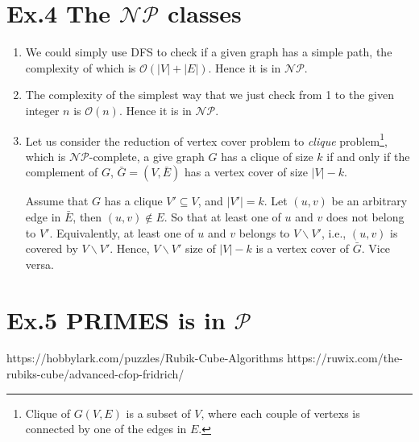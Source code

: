 \documentclass[a4paper]{article}
\begin{document}
\section*{Ex.4 The $\mathcal{NP}$ classes}
\begin{enumerate}
	\item We could simply use DFS to check if a given graph has a simple path, the complexity of which is $\mathcal{O}(|V|+|E|)$. Hence it is in $\mathcal{NP}$.
	\item The complexity of the simplest way that we just check from 1 to the given integer $n$ is $\mathcal{O}(n)$. Hence it is in $\mathcal{NP}$.
	\item Let us consider the reduction of vertex cover problem to {\it clique} problem\footnote{Clique of $G(V,E)$ is a subset of $V$, where each couple of vertexs is connected by one of the edges in $E$.}, which is $\mathcal{NP}$-complete, a give graph $G$ has a clique of size $k$ if and only if the complement of $G$, $\bar{G}=(V,\bar{E})$ has a vertex cover of size $|V|-k$.\par
	Assume that $G$ has a clique $V'\subseteq V$, and $|V'|=k$. Let $(u,v)$ be an arbitrary edge in $\bar{E}$, then $(u,v)\notin E$. So that at least one of $u$ and $v$ does not belong to $V'$. Equivalently, at least one of $u$ and $v$ belongs to $V\backslash V'$, i.e., $(u,v)$ is covered by $V\backslash V'$. Hence, $V\backslash V'$ size of $|V|-k$ is a vertex cover of $\bar{G}$. Vice versa.
\end{enumerate}

\section*{Ex.5 PRIMES is in $\mathcal{P}$}

\begin{thebibliography}{99}
https://hobbylark.com/puzzles/Rubik-Cube-Algorithms
https://ruwix.com/the-rubiks-cube/advanced-cfop-fridrich/
\end{thebibliography}
\end{document}
